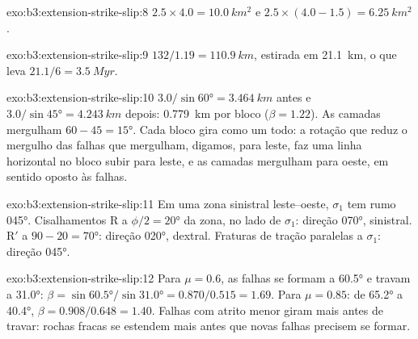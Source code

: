 \begin{solution}{exo:b3:extension-strike-slip:8}
$2.5\times4.0 = \qty{10.0}{km^2}$ e $2.5\times(4.0 - 1.5) =
\qty{6.25}{km^2}$.
\end{solution}

\begin{solution}{exo:b3:extension-strike-slip:9}
$132/1.19 = \qty{110.9}{km}$, estirada em \qty{21.1}{km}, o que leva
$21.1/6 = \qty{3.5}{Myr}$.
\end{solution}

\begin{solution}{exo:b3:extension-strike-slip:10}
$3.0/\sin\ang{60} = \qty{3.464}{km}$ antes e $3.0/\sin\ang{45} =
\qty{4.243}{km}$ depois: \qty{0.779}{km} por bloco ($\beta = 1.22$). As camadas
mergulham $60 - 45 = \ang{15}$. Cada bloco gira como um todo: a rotação que
reduz o mergulho das falhas que mergulham, digamos, para leste, faz uma linha horizontal
no bloco subir para leste, e as camadas mergulham para oeste, em sentido oposto às
falhas.
\end{solution}

\begin{solution}{exo:b3:extension-strike-slip:11}
Em uma zona sinistral leste--oeste, $\sigma_1$ tem rumo \ang{045}. Cisalhamentos R a
$\phi/2 = \ang{20}$ da zona, no lado de $\sigma_1$: direção \ang{070},
sinistral. R$'$ a $90 - 20 = \ang{70}$: direção \ang{020}, dextral. Fraturas de tração
paralelas a $\sigma_1$: direção \ang{045}.
\end{solution}

\begin{solution}{exo:b3:extension-strike-slip:12}
Para $\mu = 0.6$, as falhas se formam a \ang{60.5} e travam a \ang{31.0}: $\beta =
\sin\ang{60.5}/\sin\ang{31.0} = 0.870/0.515 = 1.69$. Para $\mu = 0.85$: de
\ang{65.2} a \ang{40.4}, $\beta = 0.908/0.648 = 1.40$. Falhas com atrito menor giram
mais antes de travar: rochas fracas se estendem mais antes que novas
falhas precisem se formar.
\end{solution}

